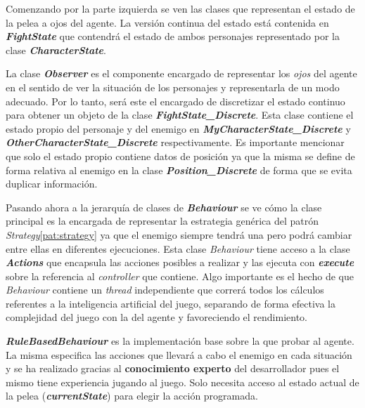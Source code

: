 \bigskip

Comenzando por la parte izquierda se ven las clases que representan el estado de la pelea a ojos del agente. La versión continua del estado está contenida en \textbf{\textit{FightState}} que contendrá el estado de ambos personajes representado por la clase \textbf{\textit{CharacterState}}.

\bigskip
La clase \textbf{\textit{Observer}} es el componente encargado de representar los \textit{ojos} del agente en el sentido de ver la situación de los personajes y representarla de un modo adecuado. Por lo tanto, será este el encargado de discretizar el estado continuo para obtener un objeto de la clase \textbf{\textit{FightState\_Discrete}}. Esta clase contiene el estado propio del personaje y del enemigo en \textbf{\textit{MyCharacterState\_Discrete}} y \textbf{\textit{OtherCharacterState\_Discrete}} respectivamente. Es importante mencionar que solo el estado propio contiene datos de posición ya que la misma se define de forma relativa al enemigo en la clase \textbf{\textit{Position\_Discrete}} de forma que se evita duplicar información.

\bigskip

Pasando ahora a la jerarquía de clases de \textbf{\textit{Behaviour}} se ve cómo la clase principal es la encargada de representar la estrategia genérica del patrón \textit{Strategy}\ref{pat:strategy} ya que el enemigo siempre tendrá una pero podrá cambiar entre ellas en diferentes ejecuciones. Esta clase \textit{Behaviour} tiene acceso a la clase \textbf{\textit{Actions}} que encapsula las acciones posibles a realizar y las ejecuta con \textbf{\textit{execute}} sobre la referencia al \textit{controller} que contiene. Algo importante es el hecho de que \textit{Behaviour} contiene un \textit{thread} independiente que correrá todos los cálculos referentes a la inteligencia artificial del juego, separando de forma efectiva la complejidad del juego con la del agente y favoreciendo el rendimiento.

\bigskip

\textbf{\textit{RuleBasedBehaviour}} es la implementación base sobre la que probar al agente. La misma especifica las acciones que llevará a cabo el enemigo en cada situación y se ha realizado gracias al \textbf{conocimiento experto} del desarrollador pues el mismo tiene experiencia jugando al juego. Solo necesita acceso al estado actual de la pelea (\textbf{\textit{currentState}}) para elegir la acción programada.

\bigskip

